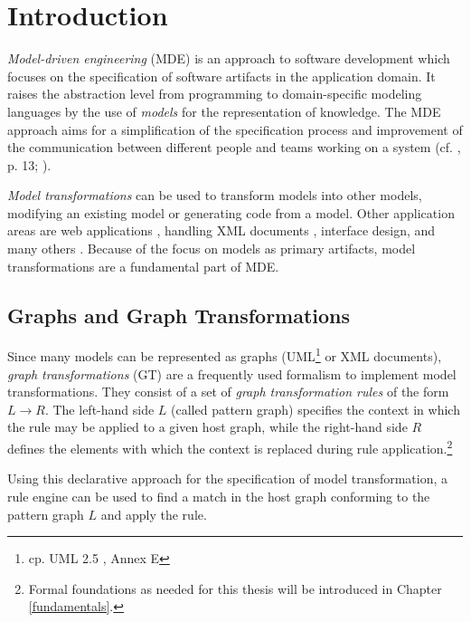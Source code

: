 
\chapter{Introduction}
\label{introduction}

\textit{Model-driven engineering} (MDE) is an approach to software development which focuses on the specification of software artifacts in the application domain.
It raises the abstraction level from programming to domain-specific modeling languages by the use of \textit{models} for the representation of knowledge.
The MDE approach aims for a simplification of the specification process and improvement of the communication between different people and teams working on a system (cf. \cite{MDEVoelter}, p. 13; \cite{HerringMernikWhenAndHowDevelopDSLs}).

\textit{Model transformations} \cite{SurveyOfModelTransformationApproaches} can be used to transform models into other models, \eg modifying an existing model or generating code from a model.
Other application areas are web applications \cite{ModelTransformationsWithinWebApplications}, handling XML documents \cite{KurtevXMLApplicationsWithModelTransformations}, interface design, and many others \cite{BxTransformationsCrossDisciplinePerspective}.
Because of the focus on models as primary artifacts, model transformations are a fundamental part of MDE.

\section{Graphs and Graph Transformations}
\label{graph-transformations}
Since many models can be represented as graphs (\eg UML\footnote{cp. UML 2.5 \cite{UMLSpecification}, Annex E} or XML documents), \textit{graph transformations} (GT) are a frequently used formalism to implement model transformations.
They consist of a set of \textit{graph transformation rules} of the form $L \rightarrow R$.
The left-hand side $L$ (called pattern graph) specifies the context in which the rule may be applied to a given host graph, while the right-hand side $R$ defines the elements with which the context is replaced during rule application.\footnote{Formal foundations as needed for this thesis will be introduced in Chapter \ref{fundamentals}.}

Using this declarative approach for the specification of model transformation, a rule engine can be used to find a match in the host graph conforming to the pattern graph $L$ and apply the rule.

